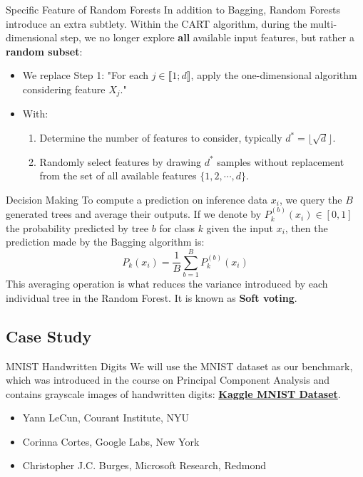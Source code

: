 \begin{frame}{Specific Feature of Random Forests}
	In addition to Bagging, Random Forests introduce an extra subtlety. Within the CART algorithm, during the multi-dimensional step, we no longer explore \textbf{all} available input features, but rather a \textbf{random subset}:
	\begin{itemize}
		\item We replace Step 1: "For each $j \in \llbracket 1;d \rrbracket$, apply the one-dimensional algorithm considering feature $X_j$."
		\item With:
		\begin{enumerate}
			\item Determine the number of features to consider, typically $d^* = \lfloor \sqrt{d} \rfloor$.
			\item Randomly select features by drawing $d^*$ samples without replacement from the set of all available features $\{1, 2, \cdots, d\}$.
		\end{enumerate}
	\end{itemize}
\end{frame}

\begin{frame}{Decision Making}
	To compute a prediction on inference data $x_i$, we query the $B$ generated trees and average their outputs. If we denote by $P_k^{(b)}(x_i) \in [0, 1]$ the probability predicted by tree $b$ for class $k$ given the input $x_i$, then the prediction made by the Bagging algorithm is:
	\begin{equation}
		P_k(x_i) = \frac{1}{B} \sum_{b=1}^B P_k^{(b)}(x_i)
		\nonumber
	\end{equation}
	This averaging operation is what reduces the variance introduced by each individual tree in the Random Forest. It is known as \textbf{Soft voting}.
\end{frame}


\subsection[Case Study]{Case Study}

\begin{frame}{MNIST Handwritten Digits}
	We will use the MNIST dataset as our benchmark, which was introduced in the course on Principal Component Analysis and contains grayscale images of handwritten digits: \href{https://www.kaggle.com/datasets/hojjatk/mnist-dataset}{\textbf{Kaggle MNIST Dataset}}.
	\begin{itemize}
		\item Yann LeCun, Courant Institute, NYU
		\item Corinna Cortes, Google Labs, New York
		\item Christopher J.C. Burges, Microsoft Research, Redmond
	\end{itemize}
\end{frame}

